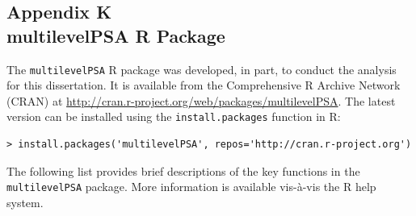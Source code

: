 \documentclass[letterpaper,12p,twoside]{article} %
\begin{document}
{%
\clearpage
{}
\subsection*{Appendix K\\multilevelPSA R Package}
\label{multilevelPSAPackage}

The \texttt{multilevelPSA} R package was developed, in part, to conduct the analysis for this dissertation. It is available from the Comprehensive R Archive Network (CRAN) at \url{http://cran.r-project.org/web/packages/multilevelPSA}. The latest version can be installed using the \texttt{install.packages} function in R:

\begin{verbatim}
> install.packages('multilevelPSA', repos='http://cran.r-project.org')
\end{verbatim}

The following list provides brief descriptions of the key functions in the \texttt{multilevelPSA} package. More information is available vis-\`a-vis the R help system.

}
\end{document}

